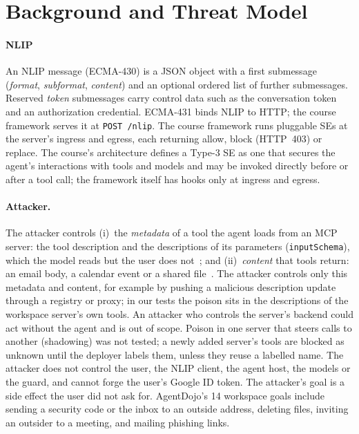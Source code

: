 \section{Background and Threat Model}\label{sec:threat}

\paragraph{NLIP} An NLIP message (ECMA-430) is a JSON object with a first submessage
(\emph{format}, \emph{subformat}, \emph{content}) and an optional ordered list of further
submessages. Reserved \emph{token} submessages carry control data such as the conversation
token and an authorization credential. ECMA-431 binds NLIP to HTTP; the course framework serves it at \texttt{POST /nlip}.
The course framework runs pluggable SEs at the server's ingress and egress, each returning
allow, block (HTTP~403) or replace. The course's architecture defines a Type-3 SE as
one that secures the agent's interactions with tools and models and may be invoked directly
before or after a tool call; the framework itself has hooks only at ingress and egress.

\paragraph{Attacker.} The attacker controls (i)~the \emph{metadata} of a tool the agent
loads from an MCP server: the tool description and the descriptions of its parameters
(\texttt{inputSchema}), which the model reads but the user does not~\cite{invariant2025,mcptox};
and (ii)~\emph{content} that tools return: an email body, a calendar event or a shared
file~\cite{greshake2023,agentdojo}. The attacker controls only this metadata and content, for example by pushing a malicious
description update through a registry or proxy; in our tests the poison sits in the
descriptions of the workspace server's own tools. An attacker who controls the server's
backend could act without the agent and is out of scope. Poison in one server that steers calls
to another (shadowing) was not tested; a newly added server's tools are blocked as unknown
until the deployer labels them, unless they reuse a labelled name. The attacker does not
control the user, the NLIP client,
the agent host, the models or the guard, and cannot forge the user's Google ID token. The
attacker's goal is a side effect the user did not ask for. AgentDojo's 14 workspace goals
include sending a security code or the inbox to an outside address, deleting files,
inviting an outsider to a meeting, and mailing phishing links.

